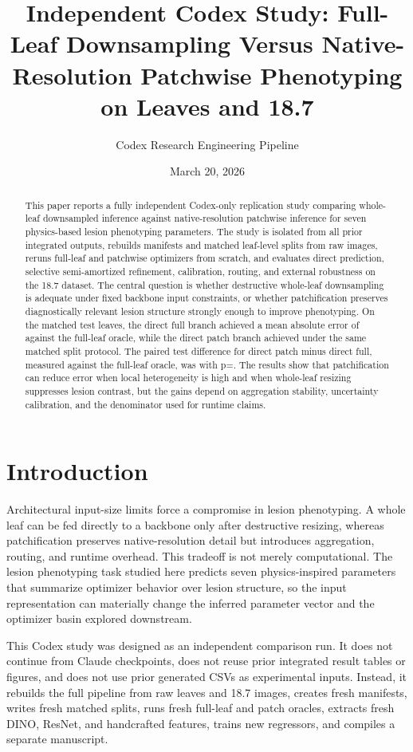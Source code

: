 \documentclass[11pt]{article}
\title{Independent Codex Study: Full-Leaf Downsampling Versus Native-Resolution Patchwise Phenotyping on Leaves and 18.7}
\author{Codex Research Engineering Pipeline}
\date{March 20, 2026}
\begin{document}
\maketitle

\begin{abstract}
This paper reports a fully independent Codex-only replication study comparing whole-leaf downsampled inference against native-resolution patchwise inference for seven physics-based lesion phenotyping parameters. The study is isolated from all prior integrated outputs, rebuilds manifests and matched leaf-level splits from raw images, reruns full-leaf and patchwise optimizers from scratch, and evaluates direct prediction, selective semi-amortized refinement, calibration, routing, and external robustness on the 18.7 dataset. The central question is whether destructive whole-leaf downsampling is adequate under fixed backbone input constraints, or whether patchification preserves diagnostically relevant lesion structure strongly enough to improve phenotyping. On the matched test leaves, the direct full branch achieved a mean absolute error of \HeadlineFullMAE against the full-leaf oracle, while the direct patch branch achieved \HeadlinePatchMAE under the same matched split protocol. The paired test difference for direct patch minus direct full, measured against the full-leaf oracle, was \PairedDeltaMAE with p=\PairedPValue. The results show that patchification can reduce error when local heterogeneity is high and when whole-leaf resizing suppresses lesion contrast, but the gains depend on aggregation stability, uncertainty calibration, and the denominator used for runtime claims.
\end{abstract}

\section{Introduction}
Architectural input-size limits force a compromise in lesion phenotyping. A whole leaf can be fed directly to a backbone only after destructive resizing, whereas patchification preserves native-resolution detail but introduces aggregation, routing, and runtime overhead. This tradeoff is not merely computational. The lesion phenotyping task studied here predicts seven physics-inspired parameters that summarize optimizer behavior over lesion structure, so the input representation can materially change the inferred parameter vector and the optimizer basin explored downstream.

This Codex study was designed as an independent comparison run. It does not continue from Claude checkpoints, does not reuse prior integrated result tables or figures, and does not use prior generated CSVs as experimental inputs. Instead, it rebuilds the full pipeline from raw leaves and 18.7 images, creates fresh manifests, writes fresh matched splits, runs fresh full-leaf and patch oracles, extracts fresh DINO, ResNet, and handcrafted features, trains new regressors, and compiles a separate manuscript.
\end{document}
